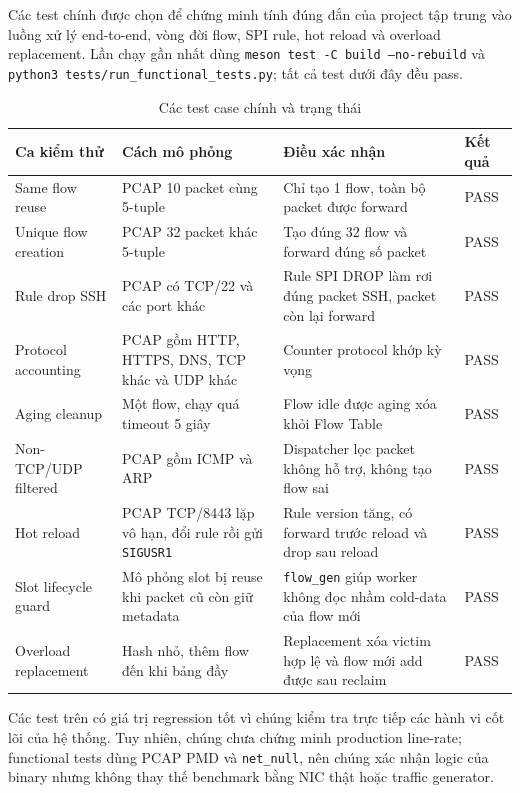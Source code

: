 \documentclass[12pt,a4paper]{report}
\DeclareRobustCommand{\code}[1]{{\small\texttt{#1}}}
\begin{document}
Các test chính được chọn để chứng minh tính đúng đắn của project tập trung vào luồng xử lý end-to-end, vòng đời flow, SPI rule, hot reload và overload replacement. Lần chạy gần nhất dùng \code{meson test -C build --no-rebuild} và \code{python3 tests/run\_functional\_tests.py}; tất cả test dưới đây đều pass.

\begin{table}[H]
\centering
\footnotesize
\caption{Các test case chính và trạng thái}
\label{tab:functional_tests}
\begin{tabularx}{\textwidth}{|L{3.1cm}|Y|Y|C{1.35cm}|}
\hline
\textbf{Ca kiểm thử} & \textbf{Cách mô phỏng} & \textbf{Điều xác nhận} & \textbf{Kết quả} \\
\hline
Same flow reuse & PCAP 10 packet cùng 5-tuple & Chỉ tạo 1 flow, toàn bộ packet được forward & PASS \\
\hline
Unique flow creation & PCAP 32 packet khác 5-tuple & Tạo đúng 32 flow và forward đúng số packet & PASS \\
\hline
Rule drop SSH & PCAP có TCP/22 và các port khác & Rule SPI DROP làm rơi đúng packet SSH, packet còn lại forward & PASS \\
\hline
Protocol accounting & PCAP gồm HTTP, HTTPS, DNS, TCP khác và UDP khác & Counter protocol khớp kỳ vọng & PASS \\
\hline
Aging cleanup & Một flow, chạy quá timeout 5 giây & Flow idle được aging xóa khỏi Flow Table & PASS \\
\hline
Non-TCP/UDP filtered & PCAP gồm ICMP và ARP & Dispatcher lọc packet không hỗ trợ, không tạo flow sai & PASS \\
\hline
Hot reload & PCAP TCP/8443 lặp vô hạn, đổi rule rồi gửi \code{SIGUSR1} & Rule version tăng, có forward trước reload và drop sau reload & PASS \\
\hline
Slot lifecycle guard & Mô phỏng slot bị reuse khi packet cũ còn giữ metadata & \code{flow\_gen} giúp worker không đọc nhầm cold-data của flow mới & PASS \\
\hline
Overload replacement & Hash nhỏ, thêm flow đến khi bảng đầy & Replacement xóa victim hợp lệ và flow mới add được sau reclaim & PASS \\
\hline
\end{tabularx}
\end{table}

Các test trên có giá trị regression tốt vì chúng kiểm tra trực tiếp các hành vi cốt lõi của hệ thống. Tuy nhiên, chúng chưa chứng minh production line-rate; functional tests dùng PCAP PMD và \code{net\_null}, nên chúng xác nhận logic của binary nhưng không thay thế benchmark bằng NIC thật hoặc traffic generator.
\end{document}
